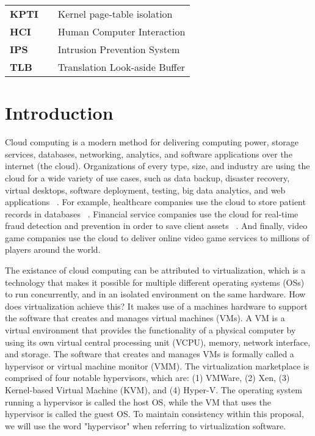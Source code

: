 \documentclass{report}
\begin{document}
\begin{spacing}{1.5}
\begin{longtable}{lcl}
\large{\bf KPTI}  & & \large{Kernel page-table isolation} \\
\large{\bf HCI}  & & \large{Human Computer Interaction} \\
\large{\bf IPS}  & & \large{Intrusion Prevention System} \\
\large{\bf TLB}  & & \large{Translation Look-aside Buffer} \\
\end{longtable}
















\newpage
\chapter{Introduction}

{\large
Cloud computing is a modern method for delivering computing power, storage services, databases, networking, analytics, and software applications over the internet (the cloud). Organizations of every type, size, and industry are using the cloud for a wide variety of use cases, such as data backup, disaster recovery, virtual desktops, software deployment, testing, big data analytics, and web applications ~\cite{BELLO2021103441}. For example, healthcare companies use the cloud to store patient records in databases ~\cite{BELLO2021103441}. Financial service companies use the cloud for real-time fraud detection and prevention in order to save client assets ~\cite{BELLO2021103441}. And finally, video game companies use the cloud to deliver online video game services to millions of players around the world.
\newline
}

{\large
\noindent The existance of cloud computing can be attributed to virtualization, which is a technology that makes it possible for multiple different operating systems (OSs) to run concurrently, and in an isolated environment on the same hardware. How does virtualization achieve this? It makes use of a machines hardware to support the software that creates and manages virtual machines (VMs). A VM is a virtual environment that provides the functionality of a physical computer by using its own virtual central processing unit (VCPU), memory, network interface, and storage. The software that creates and manages VMs is formally called a hypervisor or virtual machine monitor (VMM). The virtualization marketplace is comprised of four notable hypervisors, which are: (1) VMWare, (2) Xen, (3) Kernel-based Virtual Machine (KVM), and (4) Hyper-V. The operating system running a hypervisor is called the host OS, while the VM that uses the hypervisor is called the guest OS. To maintain consistency within this proposal, we will use the word "hypervisor" when referring to virtualization software.
\newline
}


\end{spacing}
\end{document}
